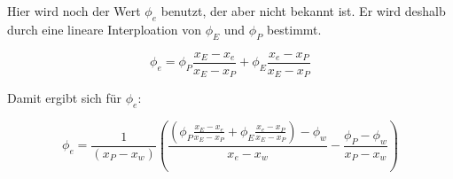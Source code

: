 \documentclass[10pt, ngerman,colorback,accentcolor=tud2d]{tudreport}
\begin{document}
Hier wird noch der Wert $\phi_e$ benutzt, der aber nicht bekannt ist. Er wird deshalb
durch eine lineare Interploation von $\phi_E$ und $\phi_P$ bestimmt.

\begin{equation}
  \phi_e = \phi_P \frac{x_E-x_e}{x_E-x_P} + \phi_E \frac{x_e-x_P}{x_E-x_P}
\end{equation}

Damit ergibt sich für $\phi_e$:

\begin{equation}
\phi_e  = \frac{1}{(x_P-x_w)}\left({
\frac{
  \left({\phi_P \frac{x_E-x_e}{x_E-x_P} + \phi_E \frac{x_e-x_P}{x_E-x_P}
}\right)
-\phi_w}{x_{e}-x_w}-\frac{\phi_P-\phi_w}{x_P-x_w}}\right)
\end{equation}
\end{document}
